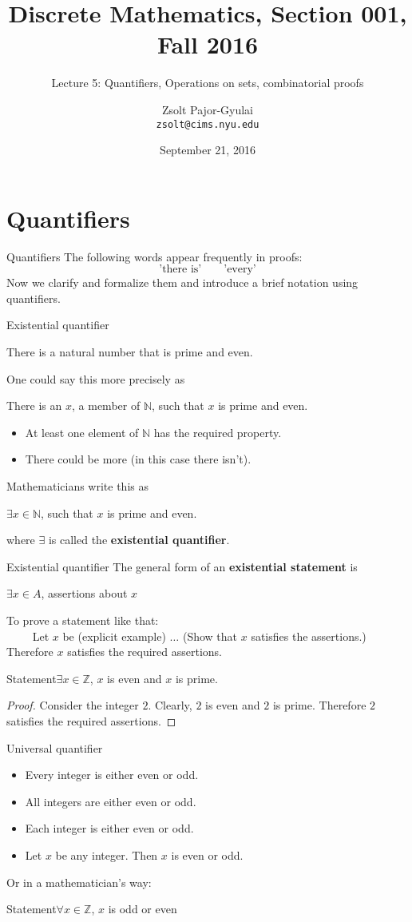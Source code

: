 \documentclass{beamer}
\title{Discrete Mathematics, Section 001, Fall 2016}
\subtitle{Lecture 5: Quantifiers, Operations on sets, combinatorial proofs}
\author[Zsolt]{Zsolt Pajor-Gyulai \\ \texttt{zsolt@cims.nyu.edu}}
\date{September 21, 2016}
\institute[NYU] 
{
\normalsize Courant Institute of Mathematical Sciences
}
\def\bl[#1]#2{\begin{block}{#1}#2\end{block}}
\def\integers{\mathbb{Z}}
\def\itemb{\begin{itemize}}
\def\iteme{\end{itemize}}
\begin{document}
\begin{frame}
  \titlepage
\end{frame}


\section{Quantifiers}

\begin{frame}{Quantifiers}
The following words appear frequently in proofs:
\[
\textrm{'there is'}\qquad\textrm{'every'}
\]\pause
Now we clarify and formalize them and introduce a brief notation using quantifiers.
\end{frame}

\begin{frame}{Existential quantifier}
\bl[]{There is a natural number that is prime and even.}\pause
One could say this more precisely as
\bl[]{There is an $x$, a member of $\mathbb{N}$, such that $x$ is prime and even.}\pause
\itemb
\item At least one element of $\mathbb{N}$ has the required property.\pause
\item There could be more (in this case there isn't).
\iteme\pause
Mathematicians write this as
\bl[]{$\exists x\in\mathbb{N}$, such that $x$ is prime and even.}
where $\exists$ is called the \textbf{existential quantifier}.
\end{frame}

\begin{frame}{Existential quantifier}
The general form of an \textbf{existential statement} is
\bl[]{$\exists x\in A$, assertions about $x$}\pause
\bl[]{To prove a statement like that:\\
~~~~ Let $x$ be (explicit example) $\dots$ (Show that $x$ satisfies the assertions.) Therefore $x$ satisfies the required assertions.}\pause

\bl[Statement]{$\exists x\in\integers$, $x$ is even and $x$ is prime.}\pause
\begin{proof}
Consider the integer $2$. Clearly, $2$ is even and $2$ is prime. Therefore $2$ satisfies the required assertions.
\end{proof}
\end{frame}

\begin{frame}{Universal quantifier}
\bl[]{
\itemb
\item Every integer is either even or odd.\pause
\item All integers are either even or odd.\pause
\item Each integer is either even or odd.\pause
\item Let $x$ be any integer. Then $x$ is even or odd.
\iteme}\pause
Or in a mathematician's way:
\bl[Statement]{$\forall x\in\integers$, $x$ is odd or even}
\end{frame}
\end{document}
